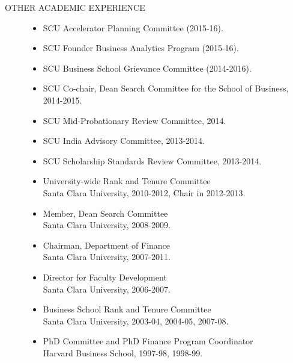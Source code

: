 \documentclass{article}
\begin{document}
\begin{description} 
\item[OTHER ACADEMIC EXPERIENCE] \mbox{}

\begin{itemize}
\setlength\itemsep{-0.1em}

\item SCU Accelerator Planning Committee (2015-16). 

\item SCU Founder Business Analytics Program (2015-16). 

\item SCU Business School Grievance Committee (2014-2016). 

\item SCU Co-chair, Dean Search Committee for the School of Business, 2014-2015.

\item SCU Mid-Probationary Review Committee, 2014.

\item SCU India Advisory Committee, 2013-2014.

\item SCU Scholarship Standards Review Committee, 2013-2014.


\item University-wide Rank and Tenure Committee\\
        Santa Clara University, 2010-2012, Chair in 2012-2013.

\item Member, Dean Search Committee\\
	Santa Clara University, 2008-2009.

\item Chairman, Department of Finance\\
	Santa Clara University, 2007-2011.

\item Director for Faculty Development\\
	Santa Clara University, 2006-2007.

\item Business School Rank and Tenure Committee \\
	Santa Clara University, 2003-04, 2004-05, 2007-08.

\item PhD Committee and PhD Finance Program Coordinator\\
        Harvard Business School, 1997-98, 1998-99.
        
\end{itemize}

\end{description}
\end{document}
